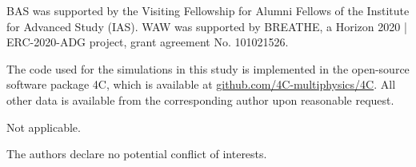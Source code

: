\documentclass[Times1COL,AMA]{WileyNJDv5} %
\begin{document}
BAS was supported by the Visiting Fellowship for Alumni Fellows of the Institute for Advanced Study (IAS).
WAW was supported by BREATHE, a Horizon 2020 | ERC-2020-ADG project, grant agreement No. 101021526.



The code used for the simulations in this study is implemented in the open-source software package 4C, which is available at \href{https://github.com/4C-multiphysics/4C}{github.com/4C-multiphysics/4C}.
All other data is available from the corresponding author upon reasonable request.


Not applicable.


The authors declare no potential conflict of interests.
\end{document}
